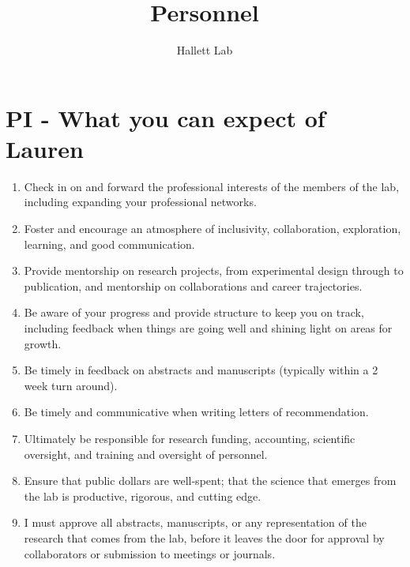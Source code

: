\documentclass[12pt]{article}
\title{Personnel}
\author{Hallett Lab}
\date{}
\begin{document}
\maketitle

\section{PI - What you can expect of Lauren}
\begin{enumerate}
\item Check in on and forward the professional interests of the members of the lab, including expanding your professional networks.
\item Foster and encourage an atmosphere of inclusivity, collaboration, exploration,
  learning, and good communication.
\item Provide mentorship on research projects, from experimental design through to publication, and mentorship on collaborations and career trajectories.
\item Be aware of your progress and provide structure to keep you on track, including feedback when things are going well and shining light on areas for growth.
\item Be timely in feedback on abstracts and manuscripts (typically within a 2 week turn around).
\item Be timely and communicative when writing letters of recommendation.
\item Ultimately be responsible for research funding, accounting,
  scientific oversight, and training and oversight of personnel.
\item Ensure that public dollars are
  well-spent; that the science that emerges from the lab is productive,
  rigorous, and cutting edge.
\item I must approve all abstracts, manuscripts, or any representation
  of the research that comes from the lab, before it leaves the door
  for approval by collaborators or submission to meetings or journals.
\end{enumerate}
\end{document}
